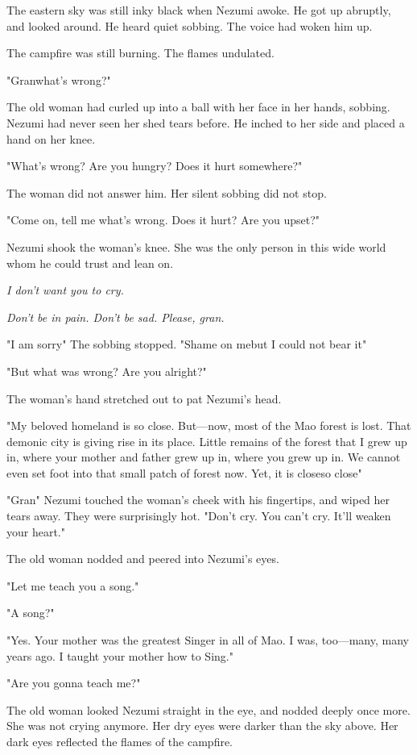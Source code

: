 \mybreak

The eastern sky was still inky black when Nezumi awoke. He got up
abruptly, and looked around. He heard quiet sobbing. The voice had woken
him up.

The campfire was still burning. The flames undulated.

"Gran\el what's wrong?"

The old woman had curled up into a ball with her face in her hands,
sobbing. Nezumi had never seen her shed tears before. He inched to her
side and placed a hand on her knee.

"What's wrong? Are you hungry? Does it hurt somewhere?"

The woman did not answer him. Her silent sobbing did not stop.

"Come on, tell me what's wrong. Does it hurt? Are you upset?"

Nezumi shook the woman's knee. She was the only person in this wide
world whom he could trust and lean on.

\emph{I don't want you to cry.}

\emph{Don't be in pain. Don't be sad. Please, gran.}

"I am sorry\el " The sobbing stopped. "Shame on me\el but I could not
bear it\el "

"But what was wrong? Are you alright?"

The woman's hand stretched out to pat Nezumi's head.

"My beloved homeland is so close. But---now, most of the Mao forest is
lost. That demonic city is giving rise in its place. Little remains of
the forest that I grew up in, where your mother and father grew up in,
where you grew up in. We cannot even set foot into that small patch of
forest now. Yet, it is close\el so close\el "

"Gran\el " Nezumi touched the woman's cheek with his fingertips, and
wiped her tears away. They were surprisingly hot. "Don't cry. You can't
cry. It'll weaken your heart."

The old woman nodded and peered into Nezumi's eyes.

"Let me teach you a song."

"A song?"

"Yes. Your mother was the greatest Singer in all of Mao. I was,
too---many, many years ago. I taught your mother how to Sing."

"Are you gonna teach me?"

The old woman looked Nezumi straight in the eye, and nodded deeply once
more. She was not crying anymore. Her dry eyes were darker than the sky
above. Her dark eyes reflected the flames of the campfire.

